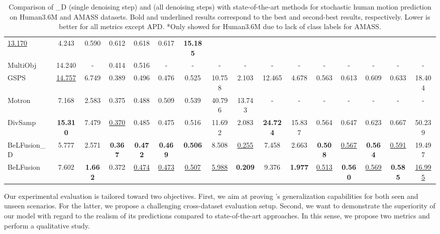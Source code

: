 \documentclass[10pt,twocolumn,letterpaper]{article}
\begin{document}
\begin{table*}[t!]
\begin{tabular}{l@{\hskip 3mm}cccccccc@{\hskip 2mm}|@{\hskip 2mm}ccccccc}
\underline{13.170} & 4.243 & 0.590 & 0.612 & 0.618 & 0.617 & \textbf{15.185}\\
MultiObj~\cite{ma2022multiobjective} & 14.240 & - & 0.414 & 0.516 & - & - & - & - & 
- & - & - & - & - & - & -\\
GSPS~\cite{mao2021gsps} & \underline{14.757} & 6.749 & 0.389 & 0.496 & 0.476 & 0.525 & 10.758 & 2.103 & 
12.465 & 4.678 & 0.563 & 0.613 & 0.609 & 0.633 & 18.404\\
Motron~\cite{salzmann2022motron} & 7.168 & 2.583 & 0.375 & 0.488 & 0.509 & 0.539 & 40.796 & 13.743 & 
- & - & - & - & - & - & -\\
DivSamp~\cite{dang2022diverse} & \textbf{15.310} & 7.479 & \underline{0.370} & 0.485 & 0.475 & 0.516 & 11.692 & 2.083 & 
\textbf{24.724} & 15.837 & 0.564 & 0.647 & 0.623 & 0.667 & 50.239\\
\midrule
BeLFusion\_D & 5.777 & 2.571 & \textbf{0.367} & \textbf{0.472} & \textbf{0.469} & \textbf{0.506} & 8.508 & \underline{0.255} & 7.458 & 2.663 & \textbf{0.508} & \underline{0.567} & \textbf{0.564} & \underline{0.591} & 19.497\\
BeLFusion & 7.602 & \textbf{1.662} & 0.372 & \underline{0.474} & \underline{0.473} & \underline{0.507} & \underline{5.988} & \textbf{0.209} & 9.376 & \textbf{1.977} & \underline{0.513} & \textbf{0.560} & \underline{0.569} & \textbf{0.585} & \underline{16.995}\\
 \bottomrule
    \end{tabular}
    \vspace{-0.1cm}
    \caption{Comparison of \modelname{}\_D (single denoising step) and \modelname{} (all denoising steps) with state-of-the-art methods for stochastic human motion prediction on Human3.6M and AMASS datasets. Bold and underlined results correspond to the best and second-best results, respectively. Lower is better for all metrics except APD. *Only showed for Human3.6M due to lack of class labels for AMASS.}
    \vspace{-0.4cm}
    \label{tab:sota_comparison}
\end{table*}
\setlength{\tabcolsep}{6pt}

Our experimental evaluation is tailored toward two objectives. First, we aim at proving \modelname{}'s generalization capabilities for both seen and unseen scenarios. For the latter, we propose a challenging cross-dataset evaluation setup. Second, we want to demonstrate the superiority of our model with regard to the realism of its predictions compared to state-of-the-art approaches. In this sense, we propose two metrics and perform a qualitative study.
\end{document}
